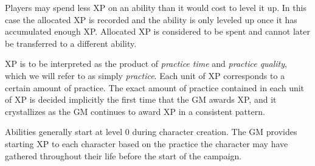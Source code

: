 Players may spend less XP on an ability than it would cost to level it up.
In this case the allocated XP is recorded and the ability is only leveled up once it has accumulated enough XP.
Allocated XP is considered to be spent and cannot later be transferred to a different ability.

XP is to be interpreted as the product of \emph{practice time} and \emph{practice quality}, which we will refer to as simply \emph{practice}.
Each unit of XP corresponds to a certain amount of practice.
The exact amount of practice contained in each unit of XP is decided implicitly the first time that the GM awards XP,
and it crystallizes as the GM continues to award XP in a consistent pattern.

Abilities generally start at level 0 during character creation.
The GM provides starting XP to each character based on the practice the character may have gathered throughout their life
before the start of the campaign.

